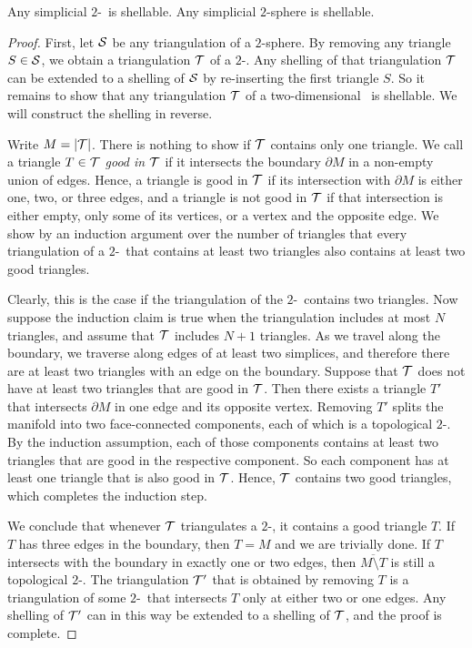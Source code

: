 \documentclass[10pt,a4paper]{article}
\begin{document}
\begin{lemma}\label{lemma:shell_2D}
    Any simplicial $2$-\disk\ is shellable.
    Any simplicial $2$-sphere is shellable. 
\end{lemma}
\begin{proof}
    First, 
    let ${\mathcal S}$ be any triangulation of a $2$-sphere. 
    By removing any triangle $S \in {\mathcal S}$, we obtain a triangulation ${\mathcal T}$ of a $2$-\disk.
    Any shelling of that triangulation ${\mathcal T}$ can be extended to a shelling of ${\mathcal S}$ by re-inserting the first triangle $S$.
    So it remains to show that any triangulation ${\mathcal T}$ of a two-dimensional \disk\ is shellable. 
    We will construct the shelling in reverse. 
    
    Write $M = \left| {\mathcal T} \right|$. 
    There is nothing to show if ${\mathcal T}$ contains only one triangle. 
    We call a triangle $T \in {\mathcal T}$ \emph{good in ${\mathcal T}$} if it intersects the boundary $\partial M$ in a non-empty union of edges. 
    Hence, a triangle is good in ${\mathcal T}$ if its intersection with $\partial M$ is either one, two, or three edges,
    and a triangle is not good in ${\mathcal T}$ if that intersection is either empty, only some of its vertices, or a vertex and the opposite edge.
    We show by an induction argument over the number of triangles that every triangulation of a $2$-\disk\ that contains at least two triangles also contains at least two good triangles. 

    Clearly, this is the case if the triangulation of the $2$-\disk\ contains two triangles. 
    Now suppose the induction claim is true when the triangulation includes at most $N$ triangles,
    and assume that ${\mathcal T}$ includes $N+1$ triangles. 
    As we travel along the boundary, we traverse along edges of at least two simplices, 
    and therefore there are at least two triangles with an edge on the boundary. 
    Suppose that ${\mathcal T}$ does not have at least two triangles that are good in ${\mathcal T}$.
    Then there exists a triangle $T'$ that intersects $\partial M$ 
    in one edge and its opposite vertex.
    Removing $T'$ splits the manifold into two face-connected components, each of which is a topological $2$-\disk. 
    By the induction assumption, each of those components contains at least two triangles 
    that are good in the respective component. 
    So each component has at least one triangle that is also good in ${\mathcal T}$. 
    Hence, ${\mathcal T}$ contains two good triangles, which completes the induction step. 
    
    We conclude that whenever ${\mathcal T}$ triangulates a $2$-\disk,
    it contains a good triangle $T$. 
    If $T$ has three edges in the boundary, then $T = M$ and we are trivially done. 
    If $T$ intersects with the boundary in exactly one or two edges, 
    then $\overline{M \setminus T}$ is still a topological $2$-\disk.
    The triangulation ${\mathcal T}'$ that is obtained by removing $T$
    is a triangulation of some $2$-\disk\ that intersects $T$ only at either two or one edges.
    Any shelling of ${\mathcal T}'$ can in this way be extended to a shelling of ${\mathcal T}$, and the proof is complete. 
\end{proof}
\end{document}

